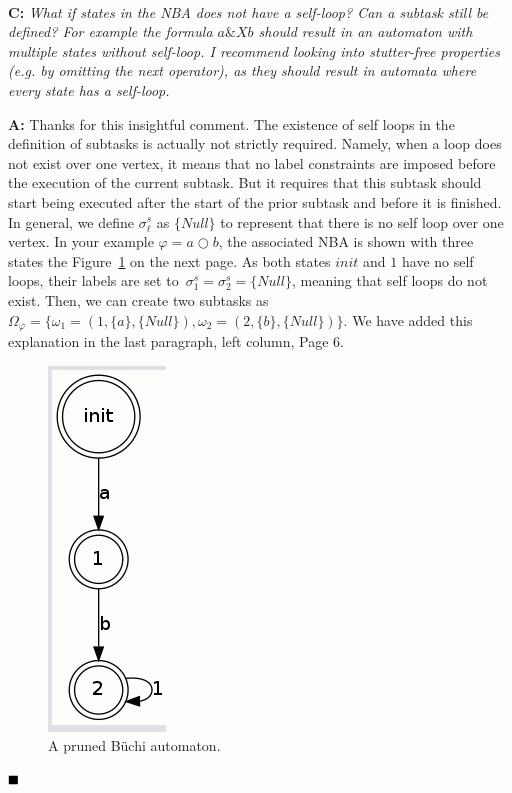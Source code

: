 \documentclass[10pt]{article}
\begin{document}
\hspace*{\fill} \

\textbf{C:}
\emph{What if states in the NBA does not have a self-loop? Can a subtask still be defined? For
	example the formula $a \& X b$ should result in an automaton with multiple states without
	self-loop. I recommend looking into stutter-free properties (e.g. by omitting the next
	operator), as they should result in automata where every state has a self-loop. }

\textbf{A:} Thanks for this insightful comment. The existence of self loops in the definition of subtasks
is actually not strictly required.
Namely, when a loop does not exist over one vertex, it means that no label constraints are imposed before the execution
of the current subtask. But it requires that this subtask should start being executed after the start of the prior subtask and before it is finished. In general,
we define $\sigma^s_\ell$ as $\{Null\}$ to represent that there is no self loop over one vertex.
In your example $\varphi=a\bigcirc b$,
the associated NBA is shown with three states the Figure~\ref{fig:anextb} on the next page. As both states $init$ and $1$ have no
self loops, their labels are set to~$\sigma^s_1=\sigma^s_2=\{Null\}$,
meaning that self loops do not exist.
Then, we can create two subtasks as $\Omega_\varphi=\{\omega_1=(1,\{a\},\{Null\}),  \omega_2=(2,\{b\},\{Null\})\}$.
We have added this explanation in the last paragraph, left column, Page 6.
\begin{figure}[ht]
	\centering
	\includegraphics[scale=0.35]{figs/aob.png}
	\caption{A pruned B\"{u}chi automaton.}
	\label{fig:anextb}
\end{figure}
$\hfill\blacksquare$
\end{document}
